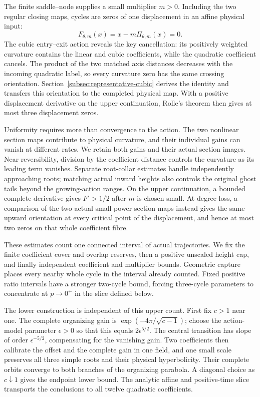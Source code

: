 \documentclass[a4paper,11pt]{article}
\numberwithin{equation}{section}
\theoremstyle{definition}
\theoremstyle{remark}
\begin{document}
The finite saddle--node supplies a small multiplier $m>0$. Including
the two regular closing maps, cycles are zeros of one displacement in
an affine physical input:
\begin{equation}\label{eq:intro-displacement}
 F_{\theta,m}(x)=x-m\Pi_{\theta,m}(x)=0.
\end{equation}
The cubic entry--exit action reveals the key cancellation: its
positively weighted curvature contains the linear and cubic
coefficients, while the quadratic coefficient cancels. The product of
the two matched axis distances decreases with the incoming quadratic
label, so every curvature zero has the same crossing orientation.
Section~\ref{subsec:representative-cubic} derives the identity and
transfers this orientation to the completed physical map. With a
positive displacement derivative on the upper continuation,
Rolle's theorem then gives at most three displacement zeros.

Uniformity requires more than convergence to the action. The two
nonlinear section maps contribute to physical curvature, and their
individual gains can vanish at different rates. We retain both gains
and their actual section images. Near reversibility, division by the
coefficient distance controls the curvature as its leading term
vanishes. Separate root-collar estimates handle independently
approaching roots; matching actual inward heights also controls the
original ghost tails beyond the growing-action ranges. On the upper
continuation, a bounded complete derivative gives $F'>1/2$ after
$m$ is chosen small.
At degree loss, a comparison of the two actual small-power section
maps instead gives the same upward orientation at every critical
point of the displacement, and hence at most two zeros on that
whole coefficient fibre.

These estimates count one connected interval of actual trajectories.
We fix the finite coefficient cover and overlap reserves, then a
positive unscaled height cap, and finally independent coefficient and
multiplier bounds. Geometric capture places every nearby whole cycle
in the interval already counted. Fixed positive ratio intervals have
a stronger two-cycle bound, forcing three-cycle parameters to
concentrate at $p\to0^+$ in the slice defined below.

The lower construction is independent of this upper count. First fix
$c>1$ near one. The complete organizing gain is
$\exp(-4\pi/\sqrt{c-1})$; choose the action-model parameter
$\epsilon>0$ so that this equals $2\epsilon^{5/2}$.
The central transition has slope of order $\epsilon^{-5/2}$,
compensating for the vanishing gain. Two coefficients then calibrate
the offset and the complete gain in one field, and one small scale
preserves all three simple roots and their physical hyperbolicity.
Their complete orbits converge to both branches of the organizing
parabola. A diagonal choice as $c\downarrow1$ gives the endpoint
lower bound. The analytic affine and positive-time slice transports
the conclusions to all twelve quadratic coefficients.
\end{document}
